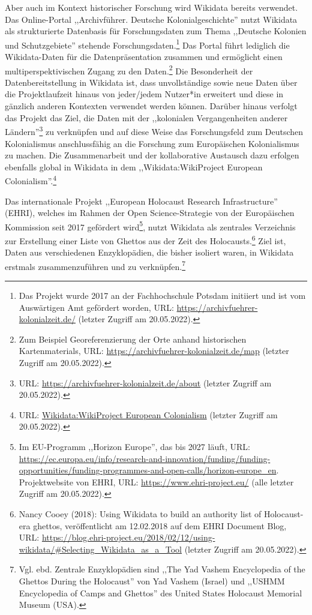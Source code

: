Aber auch im Kontext historischer Forschung wird Wikidata bereits verwendet. Das Online-Portal ,,Archivführer. Deutsche Kolonialgeschichte'' nutzt Wikidata als strukturierte Datenbasis für Forschungsdaten zum Thema ,,Deutsche Kolonien und Schutzgebiete'' stehende Forschungsdaten.\footnote{Das Projekt wurde 2017 an der Fachhochschule Potsdam initiiert und ist vom Auswärtigen Amt gefördert worden, URL: \url{https://archivfuehrer-kolonialzeit.de/} (letzter Zugriff am 20.05.2022).} Das Portal führt lediglich die Wikidata-Daten für die Datenpräsentation zusammen und ermöglicht einen multiperspektivischen Zugang zu den Daten.\footnote{Zum Beispiel Georeferenzierung der Orte anhand historischen Kartenmaterials, URL: \url{https://archivfuehrer-kolonialzeit.de/map} (letzter Zugriff am 20.05.2022).} Die Besonderheit der Datenbereitstellung in Wikidata ist, dass unvollständige sowie neue Daten über die Projektlaufzeit hinaus von jeder/jedem Nutzer*in erweitert und diese in gänzlich anderen Kontexten verwendet werden können. Darüber hinaus verfolgt das Projekt das Ziel, die Daten mit der ,,kolonialen Vergangenheiten anderer Ländern''\footnote{URL: \url{https://archivfuehrer-kolonialzeit.de/about} (letzter Zugriff am 20.05.2022).} zu verknüpfen und auf diese Weise das Forschungsfeld zum Deutschen Kolonialismus anschlussfähig an die Forschung zum Europäischen Kolonialismus zu machen. Die Zusammenarbeit und der kollaborative Austausch dazu erfolgen ebenfalls global in Wikidata in dem ,,Wikidata:WikiProject European Colonialism''.\footnote{URL: \url{Wikidata:WikiProject European Colonialism} (letzter Zugriff am 20.05.2022).} 

Das internationale Projekt ,,European Holocaust Research Infrastructure'' (EHRI), welches im Rahmen der Open Science-Strategie von der Europäischen Kommission seit 2017 gefördert wird\footnote{Im EU-Programm ,,Horizon Europe'', das bis 2027 läuft, URL: \url{https://ec.europa.eu/info/research-and-innovation/funding/funding-opportunities/funding-programmes-and-open-calls/horizon-europe_en}. Projektwebsite von EHRI, URL: \url{https://www.ehri-project.eu/} (alle letzter Zugriff am 20.05.2022).}, nutzt Wikidata als zentrales Verzeichnis zur Erstellung einer Liste von Ghettos aus der Zeit des Holocausts.\footnote{Nancy Cooey (2018): Using Wikidata to build an authority list of Holocaust-era ghettos, veröffentlicht am 12.02.2018 auf dem EHRI Document Blog, URL: \url{https://blog.ehri-project.eu/2018/02/12/using-wikidata/\#Selecting\_Wikidata\_as\_a\_Tool} (letzter Zugriff am 20.05.2022).} Ziel ist, Daten aus verschiedenen Enzyklopädien, die bisher isoliert waren, in Wikidata erstmals zusammenzuführen und zu verknüpfen.\footnote{Vgl. ebd. Zentrale Enzyklopädien sind ,,The Yad Vashem Encyclopedia of the Ghettos During the Holocaust'' von Yad Vashem (Israel) und ,,USHMM Encyclopedia of Camps and Ghettos'' des United States Holocaust Memorial Museum (USA).} 


